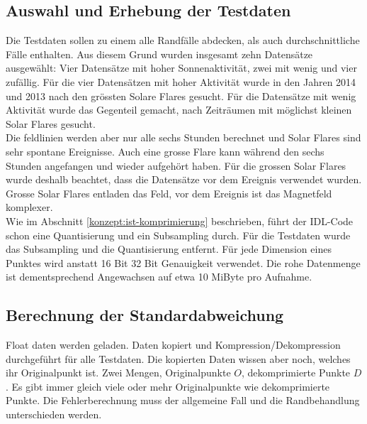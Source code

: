 \subsection{Auswahl und Erhebung der Testdaten}\label{testsetup:auswahl_erhebung}
Die Testdaten sollen zu einem alle Randfälle abdecken, als auch durchschnittliche Fälle enthalten. Aus diesem Grund wurden insgesamt zehn Datensätze ausgewählt: Vier Datensätze mit hoher Sonnenaktivität, zwei mit wenig und vier zufällig. Für die vier Datensätzen mit hoher Aktivität wurde in den Jahren 2014 und 2013 nach den grössten Solare Flares gesucht. Für die Datensätze mit wenig Aktivität wurde das Gegenteil gemacht, nach Zeiträumen mit möglichst kleinen Solar Flares gesucht.\\
Die feldlinien werden aber nur alle sechs Stunden berechnet und Solar Flares sind sehr spontane Ereignisse. Auch eine grosse Flare kann während den sechs Stunden angefangen und wieder aufgehört haben. Für die grossen Solar Flares wurde deshalb beachtet, dass die Datensätze vor dem Ereignis verwendet wurden. Grosse Solar Flares entladen das Feld, vor dem Ereignis ist das Magnetfeld komplexer.\\
[\baselineskip]
Wie im Abschnitt \ref{konzept:ist-komprimierung} beschrieben, führt der IDL-Code schon eine Quantisierung und ein Subsampling durch. Für die Testdaten wurde das Subsampling und die Quantisierung entfernt. Für jede Dimension eines Punktes wird anstatt 16 Bit 32 Bit Genauigkeit verwendet. Die rohe Datenmenge ist dementsprechend Angewachsen auf etwa 10 MiByte pro Aufnahme.

\subsection{Berechnung der Standardabweichung}\label{testsetup:ablauf}
Float daten werden geladen. Daten kopiert und Kompression/Dekompression durchgeführt für alle Testdaten. Die kopierten Daten wissen aber noch, welches ihr Originalpunkt ist.
Zwei Mengen, Originalpunkte $O$, dekomprimierte Punkte $D$. Es gibt immer gleich viele oder mehr Originalpunkte wie dekomprimierte Punkte. Die Fehlerberechnung muss der allgemeine Fall und die Randbehandlung unterschieden werden.

